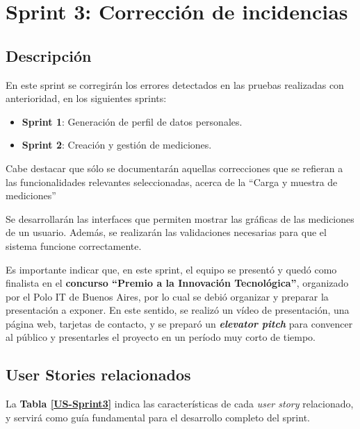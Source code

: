 \section{Sprint 3: Corrección de incidencias}%

\subsection{Descripción}
En este sprint se corregirán los errores detectados en las pruebas realizadas con anterioridad, en los siguientes sprints:
    \begin{itemize}
    \item \textbf{Sprint 1}: Generación de perfil de datos personales.
    \item \textbf{Sprint 2}: Creación y gestión de mediciones.
    \end{itemize}
    
Cabe destacar que sólo se documentarán aquellas correcciones que se refieran a las funcionalidades relevantes seleccionadas, acerca de la ``Carga y muestra de mediciones''

Se desarrollarán las interfaces que permiten mostrar las gráficas de las mediciones de un usuario.
Además, se realizarán las validaciones necesarias para que el sistema funcione correctamente.

Es importante indicar que, en este sprint, el equipo se presentó y quedó como finalista en el \textbf{concurso ``Premio a la Innovación Tecnológica''}, organizado por el Polo IT de Buenos Aires, por lo cual se debió organizar y preparar la presentación a exponer.
En este sentido, se realizó un vídeo de presentación, una página web, tarjetas de contacto, y se preparó un \textbf{\textit{elevator pitch}} para convencer al público y presentarles el proyecto en un período muy corto de tiempo.


\subsection{User Stories relacionados}
La \textbf{Tabla \ref{US-Sprint3}} indica las características de cada \textit{user story} relacionado, y servirá como guía fundamental para el desarrollo completo del sprint.

